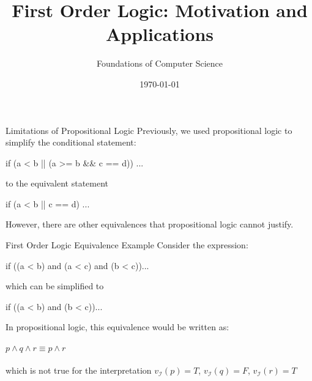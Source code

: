 \documentclass[style=sailor,size=12pt]{powerdot}
\title{First Order Logic: Motivation and Applications}
\author{Foundations of Computer Science}
\date{\today}
\begin{document}
\maketitle

\begin{wideslide}[bm=,toc=]{Limitations of Propositional Logic}
Previously, we used propositional logic to simplify the conditional statement:
\begin{program}
if (a < b || (a >= b \&\& c == d)) ...
\end{program}
\pause 
to the equivalent statement
\vspace{-1em}
\begin{program}
if (a < b || c == d) ...
\end{program}
\pause
However, there are other equivalences that propositional logic cannot justify.
\end{wideslide}

\begin{wideslide}[bm=,toc=]{First Order Logic Equivalence Example}
Consider the expression:
\begin{program}
if ((a < b) and (a < c) and (b < c))...
\end{program}
\pause
which can be simplified to
\vspace{-1em}
\begin{program}
if ((a < b) and (b < c))...
\end{program}
\vspace{-1em}
\pause
In propositional logic, this equivalence would be written as:\\~\\
$p \land q \land r \equiv p \land r$\\~\\
\pause
which is not true for the interpretation $v_{\mathcal{I}}(p) = T$,
   $v_{\mathcal{I}}(q) = F$, $v_{\mathcal{I}}(r) = T$
\end{wideslide}
\end{document}
